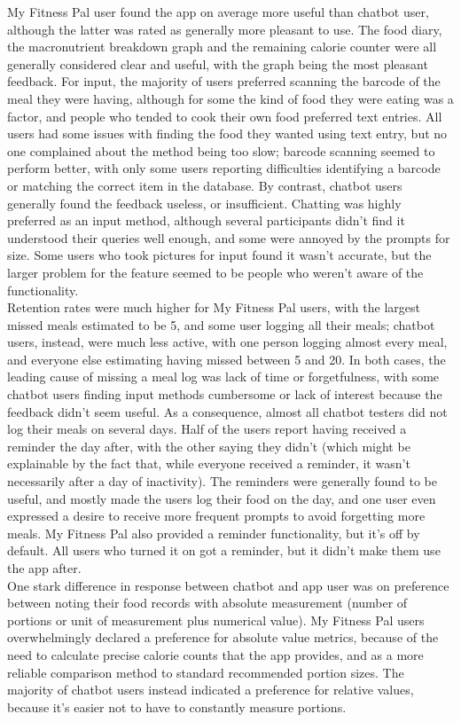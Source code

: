 My Fitness Pal user found the app on average more useful than chatbot user, although the latter was rated as generally more pleasant to use. The food diary, the macronutrient breakdown graph and the remaining calorie counter were all generally considered clear and useful, with the graph being the most pleasant feedback. For input, the majority of users preferred scanning the barcode of the meal they were having, although for some the kind of food they were eating was a factor, and people who tended to cook their own food preferred text entries. All users had some issues with finding the food they wanted using text entry, but no one complained about the method being too slow; barcode scanning seemed to perform better, with only some users reporting difficulties identifying a barcode or matching the correct item in the database. By contrast, chatbot users generally found the feedback useless, or insufficient. Chatting was highly preferred as an input method, although several participants didn't find it understood their queries well enough, and some were annoyed by the prompts for size. Some users who took pictures for input found it wasn't accurate, but the larger problem for the feature seemed to be people who weren't aware of the functionality. \\
Retention rates were much higher for My Fitness Pal users, with the largest missed meals estimated to be 5, and some user logging all their meals; chatbot users, instead, were much less active, with one person logging almost every meal, and everyone else estimating having missed between 5 and 20. In both cases, the leading cause of missing a meal log was lack of time or forgetfulness, with some chatbot users finding input methods cumbersome or lack of interest because the feedback didn't seem useful. As a consequence, almost all chatbot testers did not log their meals on several days. Half of the users report having received a reminder the day after, with the other saying they didn't (which might be explainable by the fact that, while everyone received a reminder, it wasn't necessarily after a day of inactivity). The reminders were generally found to be useful, and mostly made the users log their food on the day, and one user even expressed a desire to receive more frequent prompts to avoid forgetting more meals. My Fitness Pal also provided a reminder functionality, but it's off by default. All users who turned it on got a reminder, but it didn't make them use the app after. \\
One stark difference in response between chatbot and app user was on preference between noting their food records with absolute measurement (number of portions or unit of measurement plus numerical value). My Fitness Pal users overwhelmingly declared a preference for absolute value metrics, because of the need to calculate precise calorie counts that the app provides, and as a more reliable comparison method to standard recommended portion sizes. The majority of chatbot users instead indicated a preference for relative values, because it's easier not to have to constantly measure portions. \\
